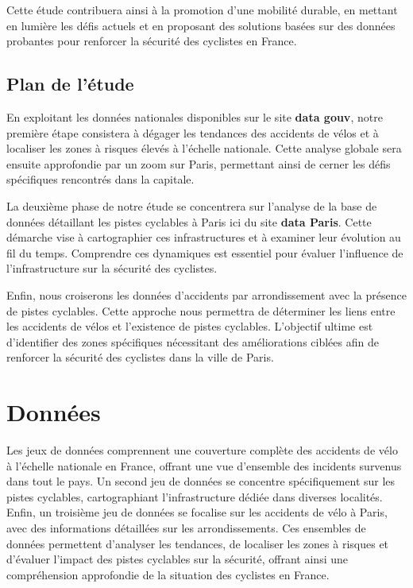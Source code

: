 \documentclass[french,]{compterendu}
\theoremstyle{urcastyle}
\theoremstyle{remark}
\begin{document}
Cette étude contribuera ainsi à la promotion d'une mobilité durable, en mettant en lumière les défis actuels et en proposant des solutions basées sur des données probantes pour renforcer la sécurité des cyclistes en France.

\hypertarget{plan-de-luxe9tude}{%
\subsection{Plan de l'étude}\label{plan-de-luxe9tude}}

En exploitant les données nationales disponibles sur le site \textbf{data gouv}, notre première étape consistera à dégager les tendances des accidents de vélos et à localiser les zones à risques élevés à l'échelle nationale. Cette analyse globale sera ensuite approfondie par un zoom sur Paris, permettant ainsi de cerner les défis spécifiques rencontrés dans la capitale.

La deuxième phase de notre étude se concentrera sur l'analyse de la base de données détaillant les pistes cyclables à Paris ici du site \textbf{data Paris}. Cette démarche vise à cartographier ces infrastructures et à examiner leur évolution au fil du temps. Comprendre ces dynamiques est essentiel pour évaluer l'influence de l'infrastructure sur la sécurité des cyclistes.

Enfin, nous croiserons les données d'accidents par arrondissement avec la présence de pistes cyclables. Cette approche nous permettra de déterminer les liens entre les accidents de vélos et l'existence de pistes cyclables. L'objectif ultime est d'identifier des zones spécifiques nécessitant des améliorations ciblées afin de renforcer la sécurité des cyclistes dans la ville de Paris.

\hypertarget{donnuxe9es}{%
\section{Données}\label{donnuxe9es}}

Les jeux de données comprennent une couverture complète des accidents de vélo à l'échelle nationale en France, offrant une vue d'ensemble des incidents survenus dans tout le pays. Un second jeu de données se concentre spécifiquement sur les pistes cyclables, cartographiant l'infrastructure dédiée dans diverses localités. Enfin, un troisième jeu de données se focalise sur les accidents de vélo à Paris, avec des informations détaillées sur les arrondissements. Ces ensembles de données permettent d'analyser les tendances, de localiser les zones à risques et d'évaluer l'impact des pistes cyclables sur la sécurité, offrant ainsi une compréhension approfondie de la situation des cyclistes en France.
\end{document}
